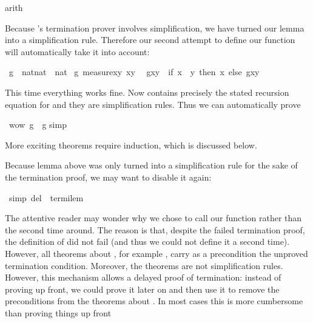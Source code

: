 \begin{isabelle}
\begin{isamarkuptxt}
\end{isamarkuptxt}%
arith{\isacharparenright}%
\begin{isamarkuptext}%
\noindent
Because 's termination prover involves simplification,
we have turned our lemma into a simplification rule. Therefore our second
attempt to define our function will automatically take it into account:%
\end{isamarkuptext}%
\ g\ {\isacharcolon}{\isacharcolon}\ {\isachardoublequote}nat{\isacharasterisk}nat\ {\isasymRightarrow}\ nat{\isachardoublequote}\isanewline
{}\ g\ {\isachardoublequote}measure{\isacharparenleft}{\isasymlambda}{\isacharparenleft}x{\isacharcomma}y{\isacharparenright}{\isachardot}\ x{\isacharminus}y{\isacharparenright}{\isachardoublequote}\isanewline
\ \ {\isachardoublequote}g{\isacharparenleft}x{\isacharcomma}y{\isacharparenright}\ {\isacharequal}\ {\isacharparenleft}if\ x\ {\isasymle}\ y\ then\ x\ else\ g{\isacharparenleft}x{\isacharcomma}y{\isacharplus}%
\begin{isamarkuptext}%
\noindent
This time everything works fine. Now  contains precisely the
stated recursion equation for  and they are simplification
rules. Thus we can automatically prove%
\end{isamarkuptext}%
\ wow{\isacharcolon}\ {\isachardoublequote}g{\isacharparenleft}\ {\isacharequal}\ g{\isacharparenleft}\isanewline
{}simp{\isacharparenright}%
\begin{isamarkuptext}%
\noindent
More exciting theorems require induction, which is discussed below.

Because lemma  above was only turned into a
simplification rule for the sake of the termination proof, we may want to
disable it again:%
\end{isamarkuptext}%
\ {\isacharbrackleft}simp\ del{\isacharbrackright}\ {\isacharequal}\ termi{\isacharunderscore}lem%
\begin{isamarkuptext}%
The attentive reader may wonder why we chose to call our function 
rather than  the second time around. The reason is that, despite
the failed termination proof, the definition of  did not
fail (and thus we could not define it a second time). However, all theorems
about , for example , carry as a precondition the
unproved termination condition. Moreover, the theorems  are
not simplification rules. However, this mechanism allows a delayed proof of
termination: instead of proving  up front, we could prove
it later on and then use it to remove the preconditions from the theorems
about . In most cases this is more cumbersome than proving things
up front


\end{isamarkuptext}
\end{isabelle}
